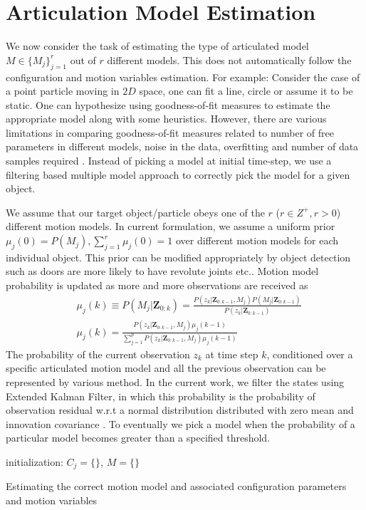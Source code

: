 \documentclass[conference]{IEEEtran}
\begin{document}
\section{Articulation Model Estimation}
We now consider the task of estimating the type of articulated model $M \in \{M_j\}_{j=1}^r$ out of $r$ different models. This does not automatically follow the configuration and motion variables estimation. For example: Consider the case of a point particle moving in $2D$ space, one can fit a line, circle or assume it to be static. One can hypothesize using goodness-of-fit measures to estimate the appropriate model along with some heuristics. However, there are various limitations in comparing goodness-of-fit measures related to number of free parameters in different models, noise in the data, overfitting and number of data samples required \cite{schunn2005evaluating}. Instead of picking a model at initial time-step, we use a filtering based multiple model approach to correctly pick the model for a given object.

We assume that our target object/particle obeys one of the $r$ ($r \in Z^+, r>0$) different motion models. In current formulation, we assume a uniform prior $\mu_j(0) = P(M_j), \sum_{j=1}^{r}\mu_j(0) = 1$ over different motion models for each individual object. This prior can be modified appropriately by object detection such as doors are more likely to have revolute joints etc.. Motion model probability is updated as more and more observations are received \cite{yaakov2001estimation} as 
\begin{align}
& \mu_j(k) \equiv P(M_j|\mathbf{Z}_{0:k})  = 
\frac{P(z_k|\mathbf{Z}_{0:k-1}, M_j)P(M_j|\mathbf{Z}_{0:k-1})}{P(z_k|\mathbf{Z}_{0:k-1})} \nonumber \\
&\mu_j(k) = \frac{P(z_k|\mathbf{Z}_{0:k-1}, M_j)\mu_j(k-1)}{\sum_{j=1}^{p} P(z_k|\mathbf{Z}_{0:k-1}, M_j)\mu_j(k-1) }
\end{align}
The probability of the current observation $z_k$ at time step $k$, conditioned over a specific articulated motion model and all the previous observation can be represented by various method. In the current work, we filter the states using Extended Kalman Filter, in which this probability is the probability of observation residual w.r.t a normal distribution distributed with zero mean and innovation covariance \cite{yaakov2001estimation}. To eventually we pick a model when the probability of a particular model becomes greater than a specified threshold.

\begin{algorithm}
 initialization: $C_j = \{\}$, $M= \{\}$ \;
 {
}
 \caption{Estimating the correct motion model and associated configuration parameters and motion variables}
\end{algorithm}
\end{document}
